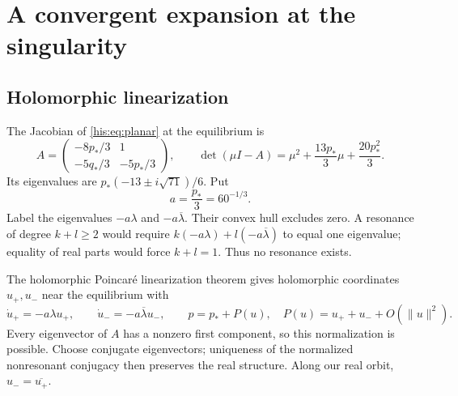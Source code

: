 \documentclass[11pt]{article}
\theoremstyle{remark}\newtheorem{remark}[theorem]{Remark}
\newcommand{\la}{\lambda}
\newcommand{\lab}{{\overline{\lambda}}}
\numberwithin{equation}{section}
\begin{document}
\section{A convergent expansion at the singularity}\label{his:sec:local}
\subsection{Holomorphic linearization}
The Jacobian of \eqref{his:eq:planar} at the equilibrium is
\begin{equation}\label{his:eq:jacobian}
 A=\begin{pmatrix}-8p_*/3&1\\-5q_*/3&-5p_*/3\end{pmatrix},\qquad
 \det(\mu I-A)=\mu^2+\frac{13p_*}{3}\mu+\frac{20p_*^2}{3}.
\end{equation}
Its eigenvalues are $p_*(-13\pm i\sqrt{71})/6$. Put
\begin{equation}\label{his:eq:a}
 a=\frac{p_*}3=60^{-1/3}.
\end{equation}
Label the eigenvalues $-a\la$ and $-a\lab$. Their convex hull excludes zero. A resonance of degree $k+l\ge2$ would require
$k(-a\la)+l(-a\lab)$ to equal one eigenvalue; equality of real parts would force $k+l=1$. Thus no resonance exists.

The holomorphic Poincar\'e linearization theorem \cite{iy2008} gives holomorphic coordinates $u_+,u_-$ near the equilibrium with
\begin{equation}\label{his:eq:linearization}
 \dot u_+=-a\la u_+,\qquad \dot u_-=-a\lab u_-,\qquad
 p=p_*+P(u),\quad P(u)=u_++u_-+O(\|u\|^2).
\end{equation}
Every eigenvector of $A$ has a nonzero first component, so this normalization is possible. Choose conjugate eigenvectors; uniqueness of the normalized nonresonant conjugacy then preserves the real structure. Along our real orbit, $u_- =\overline{u_+}$.
\end{document}

